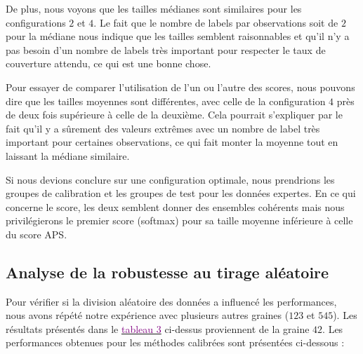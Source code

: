 \documentclass[a4paper,12pt]{article}
\begin{document}
\vspace{0.2cm}

De plus, nous voyons que les tailles médianes sont similaires pour les configurations $2$ et $4$. Le fait que le nombre de labels par observations soit de $2$ pour la médiane nous indique que les tailles semblent raisonnables et qu'il n'y a pas besoin d'un nombre de labels très important pour respecter le taux de couverture attendu, ce qui est une bonne chose.

\vspace{0.2cm}

Pour essayer de comparer l'utilisation de l'un ou l'autre des scores, nous pouvons dire que les tailles moyennes sont différentes, avec celle de la configuration $4$ près de deux fois supérieure à celle de la deuxième. Cela pourrait s'expliquer par le fait qu'il y a sûrement des valeurs extrêmes avec un nombre de label très important pour certaines observations, ce qui fait monter la moyenne tout en laissant la médiane similaire.

\vspace{0.2cm}

Si nous devions conclure sur une configuration optimale, nous prendrions les groupes de calibration et les groupes de test pour les données expertes. En ce qui concerne le score, les deux semblent donner des ensembles cohérents mais nous privilégierons le premier score (softmax) pour sa taille moyenne inférieure à celle du score APS.


\subsection{Analyse de la robustesse au tirage aléatoire}

Pour vérifier si la division aléatoire des données a influencé les performances, nous avons répété notre expérience avec plusieurs autres graines ($123$ et $545$). Les résultats présentés dans le \hyperref[tab3]{\textcolor{purple}{tableau 3}} ci-dessus proviennent de la graine $42$. Les performances obtenues pour les méthodes calibrées sont présentées ci-dessous :
\end{document}
